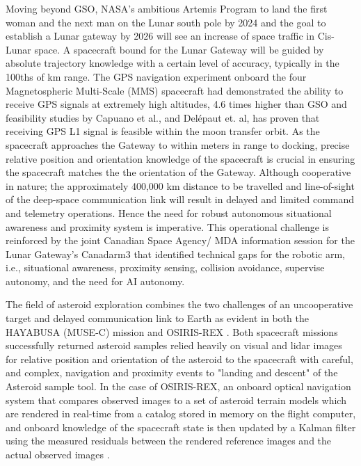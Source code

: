
Moving beyond GSO, NASA’s ambitious Artemis Program to land the first woman and the next man on the Lunar south pole by 2024 \cite{nasaArtermis20} and the goal to establish a Lunar gateway \cite{winternitzGpsLunarGateway19} by 2026 will see an increase of space traffic in Cis-Lunar space. A spacecraft bound for the Lunar Gateway will be guided by absolute trajectory knowledge with a certain level of accuracy, typically in the 100ths of km range. The GPS navigation experiment onboard the four Magnetospheric Multi-Scale (MMS) spacecraft had demonstrated the ability to receive GPS signals at extremely high altitudes, 4.6 times higher than GSO \cite{winternitzGpsLunarGateway19} and feasibility studies by Capuano et al.,  \cite{capuanoGpsLunarNav16} and Delépaut et. al, \cite{DelepautGpsLunarNav16} has proven that receiving GPS L1 signal is feasible within the moon transfer orbit. As the spacecraft approaches the Gateway to within meters in range to docking, precise relative position and orientation knowledge of the spacecraft is crucial in ensuring the spacecraft matches the the orientation of the Gateway. Although cooperative in nature; the approximately 400,000 km distance to be travelled  and line-of-sight of the deep-space communication link will result in delayed and limited command and telemetry operations. Hence the need for robust autonomous situational awareness and proximity system is imperative. This operational challenge is reinforced by the joint Canadian Space Agency/ MDA information session for the Lunar Gateway’s Canadarm3 \footnotemark[8]{} that identified technical gaps for the robotic arm, i.e., situational awareness, proximity sensing, collision avoidance, supervise autonomy, and the need for AI autonomy.

The field of asteroid exploration combines the two challenges of an uncooperative target and delayed communication link to Earth as evident in both the HAYABUSA (MUSE-C) mission \cite{Kobayasi3DofPoseAsteroid15} and OSIRIS-REX \cite{leonarOsirusRex19}. Both spacecraft missions successfully returned asteroid samples relied heavily on visual and lidar images for relative position and orientation of the asteroid to the spacecraft with careful, and complex, navigation and proximity events to "landing and descent" of the Asteroid sample tool. In the case of OSIRIS-REX, an onboard optical navigation system that compares observed images to a set of asteroid terrain models which are rendered in real-time from a catalog stored in memory on the flight computer, and onboard knowledge of the spacecraft state is then updated by a Kalman filter using the measured residuals between the rendered reference images and the actual observed images \cite{lorenzOsirusRexAutoNav}.      

